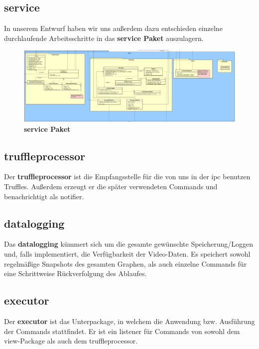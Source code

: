 \subsection{\textbf{service}}


In unserem Entwurf haben wir uns außerdem dazu entschieden einzelne
durchlaufende Arbeitsschritte in das \textbf{service Paket} auszulagern.\newline

\begin{figure}[H]
  \centering
  \includegraphics[width=\textwidth]{../diagramimages/service.png}
  \caption{\textbf{service Paket}}
  \medskip
\end{figure}

    \subsection*{\textbf{truffleprocessor}}
    Der \textbf{truffleprocessor} ist die Empfangsstelle für die von uns in der
    \gls{ipc} benutzen Truffles. Außerdem erzeugt er die später verwendeten
    Commands und benachrichtigt als \gls{notifier}.

    \subsection*{\textbf{datalogging}}
    Das \textbf{datalogging} kümmert sich um die gesamte gewünschte
    Speicherung/Loggen und, falls implementiert, die Verfügbarkeit der
    Video-Daten. Es speichert sowohl regelmäßige Snapshots des gesamten
    Graphen, als auch einzelne Commands für eine Schrittweise Rückverfolgung
    des Ablaufes.

    \subsection*{\textbf{executor}}
    Der \textbf{executor} ist das Unterpackage, in welchem die Anwendung bzw.
    Ausführung der Commands stattfindet. Er ist ein \gls{listener} für Commands
    von sowohl dem view-Package als auch dem truffleprocessor.


